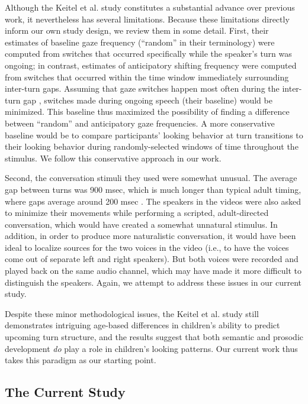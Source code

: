 \documentclass[authoryear, 12pt]{elsarticle}
\begin{document}
Although the Keitel et al. \citeyearpar{keitel2013} study constitutes a substantial advance over previous work, it nevertheless has several limitations. Because these limitations directly inform our own study design, we review them in some detail. First, their estimates of baseline gaze frequency (``random'' in their terminology) were computed from switches that occurred specifically while the speaker's turn was ongoing; in contrast, estimates of anticipatory shifting frequency were computed from switches that occurred within the time window immediately surrounding inter-turn gaps. Assuming that gaze switches happen most often during the inter-turn gap \citep{hirvenkari2013}, switches made during ongoing speech (their baseline) would be minimized. This baseline thus maximized the possibility of finding a difference between ``random'' and anticipatory gaze frequencies. A more conservative baseline would be to compare participants' looking behavior at turn transitions to their looking behavior during randomly-selected windows of time throughout the stimulus. We follow this conservative approach in our work. 

Second, the conversation stimuli they used were somewhat unusual. The average gap between turns was 900 msec, which is much longer than typical adult timing, where gaps average around 200 msec \citep{stivers2009}. The speakers in the videos were also asked to minimize their movements while performing a scripted, adult-directed conversation, which would have created a somewhat unnatural stimulus. In addition, in order to produce more naturalistic conversation, it would have been ideal to localize sources for the two voices in the video (i.e., to have the voices come out of separate left and right speakers). But both voices were recorded and played back on the same audio channel, which may have made it more difficult to distinguish the speakers. Again, we attempt to address these issues in our current study. 

Despite these minor methodological issues, the Keitel et al. \citeyearpar{keitel2013} study still demonstrates intriguing age-based differences in children's ability to predict upcoming turn structure, and the results suggest that both semantic and prosodic development \textit{do} play a role in children's looking patterns. Our current work thus takes this paradigm as our starting point.

\subsection{The Current Study}
\end{document}
